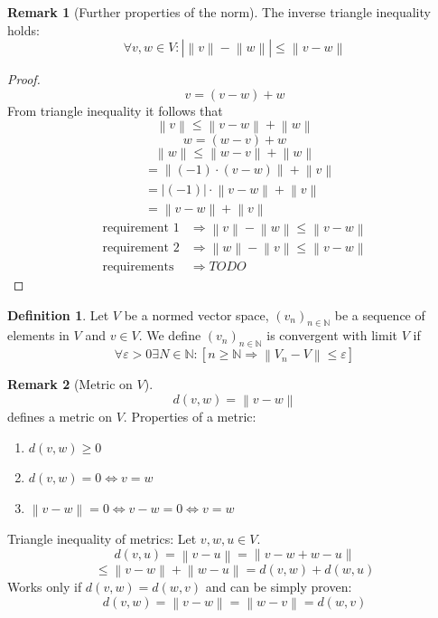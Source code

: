 \documentclass[a4paper,landscape,twocolumn]{article}
\theoremstyle{definition}
\newtheorem{defi}{Definition}
\newtheorem{rem}{Remark}
\newcommand\abs[1]{\left|#1\right|}
\newcommand\norm[1]{\left\|#1\right\|}
\begin{document}
\begin{rem}[Further properties of the norm]
  The inverse triangle inequality holds:
  \[ \forall v,w \in V: \abs{\norm{v} - \norm{w}} \leq \norm{v - w} \]
\end{rem}
\begin{proof}
  \[ v = (v - w) + w \]
  From triangle inequality it follows that
  \[ \norm{v} \leq \norm{v - w} + \norm{w} \]
  \[ w = (w - v) + w \]
  \[ \norm{w} \leq \norm{w - v} + \norm{w} \]
  \begin{align*}
    &= \norm{(-1) \cdot (v - w)} + \norm{v} \\
    &= \abs{(-1)} \cdot \norm{v - w} + \norm{v} \\
    &= \norm{v - w} + \norm{v}
  \end{align*}
  \begin{align*}
    \text{requirement 1} &\Rightarrow \norm{v} - \norm{w} \leq \norm{v - w} \\
    \text{requirement 2} &\Rightarrow \norm{w} - \norm{v} \leq \norm{v - w} \\
    \text{requirements} &\Rightarrow  TODO
  \end{align*}
\end{proof}

\begin{defi}
  Let $V$ be a normed vector space, $(v_n)_{n\in\mathbb N}$ be a sequence of
  elements in $V$ and $v \in V$. We define $(v_n)_{n\in\mathbb N}$ is convergent
  with limit $V$ if
  \[
    \forall \varepsilon > 0 \exists N \in \mathbb N:
    \left[n \geq \mathbb N \Rightarrow \norm{V_n - V} \leq \varepsilon\right]
  \]
\end{defi}
\begin{rem}[Metric on $V$]
  \[ d(v, w) = \norm{v - w} \]
  defines a metric on $V$.
  Properties of a metric:
  \begin{enumerate}
    \item $d(v,w) \geq 0$
    \item $d(v,w) = 0 \Leftrightarrow v = w$
    \item $\norm{v - w} = 0 \Leftrightarrow v - w = 0 \Leftrightarrow v = w$
  \end{enumerate}
  Triangle inequality of metrics:
  Let $v,w,u \in V$.
  \[ d(v,u) = \norm{v - u} = \norm{v - w + w - u} \]
  \[ \leq \norm{v - w} + \norm{w - u} = d(v,w) + d(w,u) \]
  Works only if $d(v,w) = d(w,v)$ and can be simply proven:
  \[ d(v,w) = \norm{v-w} = \norm{w - v} = d(w,v) \]
\end{rem}
\end{document}

